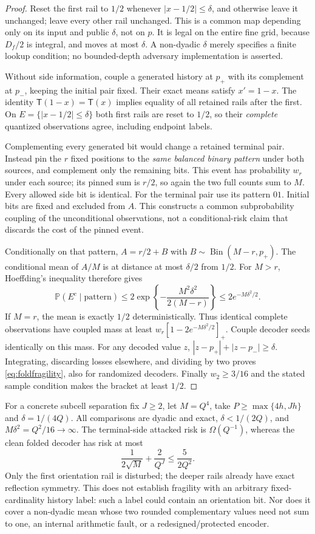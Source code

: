 \documentclass[11pt,letterpaper]{article}
\theoremstyle{definition}\newtheorem{definition}[theorem]{Definition}
\theoremstyle{remark}\newtheorem{remark}[theorem]{Remark}
\newcommand{\Prob}{\mathbb{P}}
\begin{document}
\begin{proof}
Reset the first rail to $1/2$ whenever $|x-1/2|\le\delta$, and otherwise leave it unchanged; leave every other rail unchanged. This is a common map depending only on its input and public $\delta$, not on $p$. It is legal on the entire fine grid, because $D_f/2$ is integral, and moves at most $\delta$. A non-dyadic $\delta$ merely specifies a finite lookup condition; no bounded-depth adversary implementation is asserted.

Without side information, couple a generated history at $p_+$ with its complement at $p_-$, keeping the initial pair fixed. Their exact means satisfy $x'=1-x$. The identity $\mathsf T(1-x)=\mathsf T(x)$ implies equality of all retained rails after the first. On $E=\{|x-1/2|\le\delta\}$ both first rails are reset to $1/2$, so their \emph{complete} quantized observations agree, including endpoint labels.

Complementing every generated bit would change a retained terminal pair. Instead pin the $r$ fixed positions to the \emph{same balanced binary pattern} under both sources, and complement only the remaining bits. This event has probability $w_r$ under each source; its pinned sum is $r/2$, so again the two full counts sum to $M$. Every allowed side bit is identical. For the terminal pair use its pattern $01$. Initial bits are fixed and excluded from $A$. This constructs a common subprobability coupling of the unconditional observations, not a conditional-risk claim that discards the cost of the pinned event.

Conditionally on that pattern, $A=r/2+B$ with $B\sim\operatorname{Bin}(M-r,p_+)$. The conditional mean of $A/M$ is at distance at most $\delta/2$ from $1/2$. For $M>r$, Hoeffding's inequality therefore gives
\[
 \Prob(E^c\mid\text{pattern})
 \le 2\exp\!\left\{-\frac{M^2\delta^2}{2(M-r)}\right\}
 \le2e^{-M\delta^2/2}.
\]
If $M=r$, the mean is exactly $1/2$ deterministically. Thus identical complete observations have coupled mass at least $w_r[1-2e^{-M\delta^2/2}]_+$. Couple decoder seeds identically on this mass. For any decoded value $z$, $|z-p_+|+|z-p_-|\ge\delta$. Integrating, discarding losses elsewhere, and dividing by two proves \eqref{eq:foldfragility}, also for randomized decoders. Finally $w_2\ge3/16$ and the stated sample condition makes the bracket at least $1/2$.
\end{proof}

For a concrete subcell separation fix $J\ge2$, let $M=Q^4$, take $P\ge\max\{4h,Jh\}$ and $\delta=1/(4Q)$. All comparisons are dyadic and exact, $\delta<1/(2Q)$, and $M\delta^2=Q^2/16\to\infty$. The terminal-side attacked risk is $\Omega(Q^{-1})$, whereas the clean folded decoder has risk at most
\[
 \frac1{2\sqrt M}+\frac2{Q^J}\le\frac5{2Q^2}.
\]
Only the first orientation rail is disturbed; the deeper rails already have exact reflection symmetry. This does not establish fragility with an arbitrary fixed-cardinality history label: such a label could contain an orientation bit. Nor does it cover a non-dyadic mean whose two rounded complementary values need not sum to one, an internal arithmetic fault, or a redesigned/protected encoder.
\end{document}
